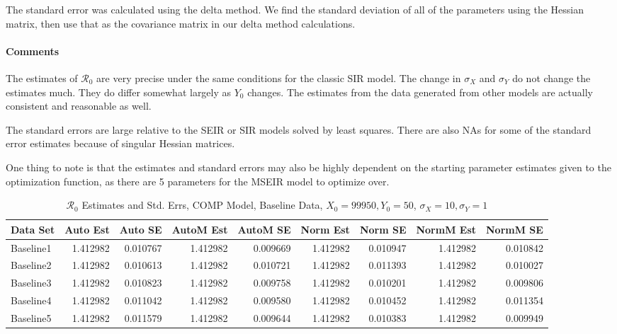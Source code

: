 \documentclass[12pt]{article}
\newcommand{\rr}{\ensuremath{\mathcal{R}_0}}
\begin{document}
The standard error was calculated using the delta method. We find the standard deviation of all of the parameters using the Hessian matrix, then use that as the covariance matrix in our delta method calculations.

\paragraph{Comments}

The estimates of $\rr$ are very precise under the same conditions for the classic SIR model. The change in $\sigma_X$ and $\sigma_Y$ do not change the estimates much. They do differ somewhat largely as $Y_0$ changes. The estimates from the data generated from other models are actually consistent and reasonable as well.

The standard errors are large relative to the SEIR or SIR models solved by least squares. There are also NAs for some of the standard error estimates because of singular Hessian matrices.

One thing to note is that the estimates and standard errors may also be highly dependent on the starting parameter estimates given to the optimization function, as there are 5 parameters for the MSEIR model to optimize over.

\begin{table}[H]
	
	\caption{$\rr$ Estimates and Std. Errs, COMP Model, 
		Baseline Data, $X_0 = 99950, Y_0 = 50$, 
		$\sigma_X = 10, \sigma_Y = 1$}
	\begin{footnotesize}
		\hskip -1cm
		\begin{tabular}{l|r|r|r|r|r|r|r|r}
			\hline
			Data Set & Auto Est & Auto SE & AutoM Est & AutoM SE & Norm Est & Norm SE & NormM Est & NormM SE\\
			\hline
			Baseline1 & 1.412982 & 0.010767 & 1.412982 & 0.009669 & 1.412982 & 0.010947 & 1.412982 & 0.010842\\
			\hline
			Baseline2 & 1.412982 & 0.010613 & 1.412982 & 0.010721 & 1.412982 & 0.011393 & 1.412982 & 0.010027\\
			\hline
			Baseline3 & 1.412982 & 0.010823 & 1.412982 & 0.009758 & 1.412982 & 0.010201 & 1.412982 & 0.009806\\
			\hline
			Baseline4 & 1.412982 & 0.011042 & 1.412982 & 0.009580 & 1.412982 & 0.010452 & 1.412982 & 0.011354\\
			\hline
			Baseline5 & 1.412982 & 0.011579 & 1.412982 & 0.009644 & 1.412982 & 0.010383 & 1.412982 & 0.009949\\
			\hline
		\end{tabular}
	\end{footnotesize}
\end{table}
\end{document}
